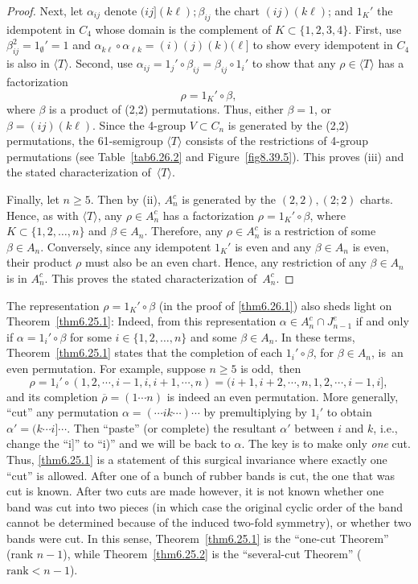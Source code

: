 \documentclass{surv-l}
\numberwithin{equation}{section}
\numberwithin{table}{section}
\numberwithin{figure}{section}
\theoremstyle{definition}
\begin{document}
\begin{proof}
\noindent Next, let $\alpha_{ij}$ denote $(ij](k\ell);\beta_{ij}$ the chart
$(ij)(k\ell)$; and $1_{K}'$ the idempotent in $C_{4}$ whose domain
is the complement of $K\subset\{1,2,3,4\}$. First, use
$\beta_{ij}^{2}= 1_{\emptyset}'=1$ and $\alpha_{k\ell}\circ
\alpha_{\ell k}=(i)(j)(k)(\ell]$ to show every idempotent in $C_{4}$
is also in $\langle T\rangle$. Second, use
$\alpha_{ij}=1_{j}'\circ\beta_{ij}=\beta_{ij}\circ 1_{i}'$ to show
that any $\rho\in\langle T\rangle$ has a factorization
\[
\rho=1_{K}'\circ\beta,
\]
where $\beta$ is a product of (2,2) permutations. Thus, either
$\beta=1$, or $\beta= (ij)(k\ell)$. Since the 4-group $V\subset
C_{n}$ is generated by the (2,2) permutations, the 61-semigroup
$\langle T\rangle$ consists of the restrictions of 4-group
permutations (see Table~\ref{tab6.26.2} and
Figure~\ref{fig8.39.5}). This proves (iii) and the stated
characterization of~$\langle T\rangle$.

Finally, let $n \geq 5$. Then by (ii), $A_{n}^{c}$ is generated by
the $(2,2),(2;2)$ charts. Hence, as with $\langle T\rangle$, any
$\rho\in A_{n}^{c}$ has a factorization $\rho=1_{K}'\circ\beta$,
where $K\subset\{1,2,\ldots, n\}$ and $\beta\in A_{n}$. Therefore,
any $\rho\in A_{n}^{c}$ is a restriction of some $\beta\in A_{n}$.
Conversely, since any idempotent $1_{K}'$ is even and any
$\beta\in A_{n}$ is even, their product $\rho$ must also be an
even chart. Hence, any restriction of any $\beta\in A_{n}$ is in
$A_{n}^{c}$. This proves the stated characterization
of~$A_{n}^{c}.$
\end{proof}

The representation $\rho=1_{K}'\circ\beta$ (in the proof of
\ref{thm6.26.1}) also sheds light on Theorem~\ref{thm6.25.1}:
Indeed, from this representation $\alpha\in A_{n}^{c}\cap
J_{n-1}^{e}$ if and only if $\alpha=1_{i}'\circ\beta$ for some
$i\in\{1,2,\ldots, n\}$ and some $\beta\in A_{n}$. In these terms,
Theorem~\ref{thm6.25.1} states that the completion
of each $1_{i}'\circ\beta$, for
$\beta\in A_{n}$, is~an even permutation. For example, suppose $n
\geq 5$ is odd,~then
\[
\rho=1_{i}'\circ(1,2, \cdots, i-1, i, i+1, \cdots, n) =(i+1, i+2,
\cdots, n, 1, 2, \cdots, i-1, i],
\]
and its completion $\overline{\rho}=(1\cdots n)$ is indeed an even
permutation. More generally, ``cut'' any permutation
$\alpha=(\cdots ik\cdots)\cdots$ by premultiplying by $1_{i}'$ to
obtain $\alpha'=(k\cdots i]\cdots$. Then ``paste'' (or complete)
the resultant $\alpha'$ between $i$ and $k$, i.e., change the
``i]'' to ``i)'' and we will be back to $\alpha$. The key is to
make only \emph{one} cut. Thus, \ref{thm6.25.1} is a statement of
this surgical invariance where exactly one ``cut'' is allowed.
After one of a bunch of rubber bands is cut, the one that was cut
is known. After two cuts are made however, it is not known whether
one band was cut into two pieces (in which case the original
cyclic order of the band cannot be determined because of the
induced two-fold symmetry), or whether two bands were cut. In this
sense, Theorem~\ref{thm6.25.1} is the ``one-cut Theorem'' (rank $n
-1$), while Theorem~\ref{thm6.25.2} is the ``several-cut Theorem''
($\mathrm{rank} <n -1$).
\end{document}
